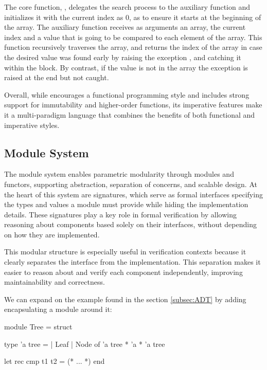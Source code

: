 The core function, , delegates the search process to the auxiliary function and initializes it with the current
index as 0, as to ensure it starts at the beginning of the array. The auxiliary function  receives as arguments 
an array, the current index and a value that is going to be 
compared to each element of the array. This function recursively traverses the array, and returns the index of the array in case the desired 
value was found early by raising the exception , and catching it within the  block. By contrast, 
if the value is not in the array the exception  is raised at the end but not caught.

Overall, while \ocaml encourages a functional programming style and includes strong support for immutability and higher-order functions, 
its imperative features make it a multi-paradigm language that combines the benefits of both functional and imperative styles.

\subsection{Module System}

The module system enables parametric modularity through modules and functors, supporting abstraction, separation of concerns, and 
scalable design. At the heart of this system are signatures, which serve as formal interfaces specifying the types and values a 
module must provide while hiding the implementation details. These signatures play a key role in formal verification by allowing 
reasoning about components based solely on their interfaces, without depending on how they are implemented.

This modular structure is especially useful in verification contexts because it clearly separates the interface from the 
implementation. This separation makes it easier to reason about and verify each component independently, improving 
maintainability and correctness.

We can expand on the example found in the section \ref{subsec:ADT} by adding encapsulating a module around it:

\begin{ocamlenv}
module Tree = struct

  type 'a tree =
    | Leaf
    | Node of 'a tree * 'a * 'a tree

  let rec cmp t1 t2 = (* ... *)
end
\end{ocamlenv}

